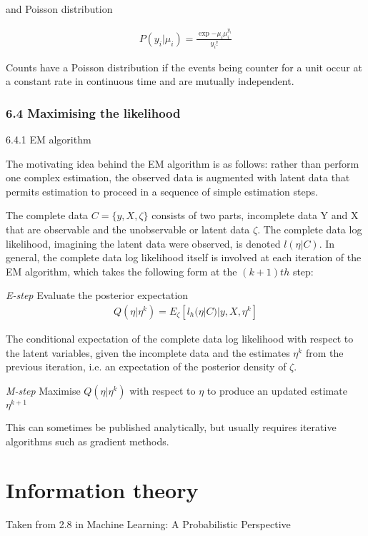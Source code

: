 \documentclass{amsart}
\begin{document}
and Poisson distribution

\begin{align*}
	P(y_i|\mu_i) = \frac{\exp{-\mu_i}\mu_i^{y_i}}{y_i !}
\end{align*}

Counts have a Poisson distribution if the events being counter for a unit occur at a
constant rate in continuous time and are mutually independent.


\subsubsection{6.4 Maximising the likelihood}

6.4.1 EM algorithm

The motivating idea behind the EM algorithm is as follows: rather than perform one complex estimation, the observed data is augmented with latent data that permits estimation to proceed in a sequence of simple estimation steps.
 
The complete data $C=\{y, X, \zeta\}$ consists of two parts,  incomplete data Y and X 
that are observable and the unobservable or latent data $\zeta$. The complete data log 
likelihood, imagining the latent data were observed, is denoted $l(\eta|C)$. In general, 
the complete data log likelihood itself is involved at each iteration of the EM 
algorithm, which takes the following form at the $(k+1)th$ step:

\emph{E-step} Evaluate the posterior expectation
\begin{align*}
	Q(\eta|\eta^k) = E_\zeta [l_h(\eta|C)|y, X, \eta^k]
\end{align*}

The conditional expectation of the complete data log likelihood with respect to the latent variables, given the incomplete data and the estimates $\eta^k$ from the previous iteration, i.e. an expectation of the posterior density of $\zeta$.


\emph{M-step} Maximise $Q(\eta|\eta^k)$ with respect to $\eta$ to produce an updated
estimate $\eta^{k+1}$

This can sometimes be published analytically, but usually requires iterative algorithms 
such as gradient methods.

\section{Information theory}
Taken from 2.8 in Machine Learning: A Probabilistic Perspective
\end{document}
